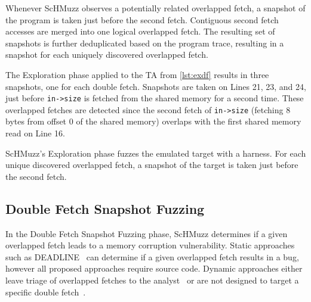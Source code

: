 \documentclass[conference]{IEEEtran}
\newcommand{\sysname}{ScHMuzz\xspace}
\newcommand{\stageone}{Exploration\xspace}
\newcommand{\stagetwo}{Double Fetch Snapshot Fuzzing\xspace}
\begin{document}
Whenever \sysname observes a potentially related overlapped fetch, 
a snapshot of the program is taken just before the second fetch. Contiguous second fetch accesses 
are merged into one logical overlapped fetch. 
The resulting set of snapshots is further deduplicated based on the program trace, resulting 
in a snapshot for each uniquely discovered overlapped fetch. 
 
The \stageone phase applied to the TA from \autoref{lst:exdf} results 
in three snapshots, one for each double fetch. Snapshots are taken on Lines 21, 23, and 24, 
just before \texttt{in->size} is fetched from the shared memory for a second time. These overlapped fetches 
are detected since the second fetch of \texttt{in->size} (fetching 8 bytes from offset 0 of 
the shared memory) overlaps with the first shared memory read on Line 16. 

\begin{tcolorbox}
    \sysname's \stageone phase fuzzes the emulated target with a harness. For each unique discovered overlapped fetch, 
    a snapshot of the target is taken just before the second fetch.  
\end{tcolorbox}


\subsection{\stagetwo}
In the \stagetwo phase, \sysname determines if a given overlapped fetch leads to a memory corruption vulnerability. 
Static approaches such as DEADLINE~\cite{deadline} 
can determine if a given overlapped fetch results in a bug, however all proposed 
approaches require source code. Dynamic approaches  
either leave triage of overlapped fetches to the analyst~\cite{bochspwn} or are 
not designed to target a specific double fetch~\cite{decaf,chen2024enclavefuzz,morphuzz}.
\end{document}
